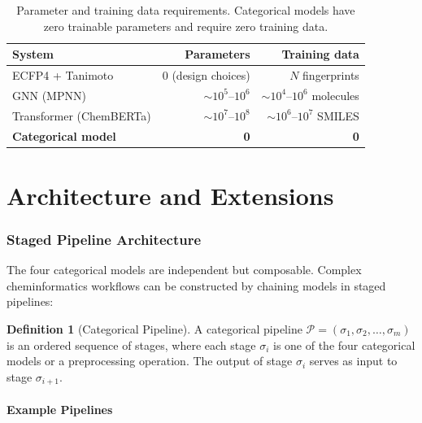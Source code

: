 \documentclass[11pt,twocolumn,a4paper]{article}
\theoremstyle{definition}
\newtheorem{definition}[theorem]{Definition}
\theoremstyle{remark}
\newcommand{\Pipeline}{\mathcal{P}}
\begin{document}
\begin{table}[h]
\centering
\small
\begin{tabular}{lrr}
\toprule
\textbf{System} & \textbf{Parameters} & \textbf{Training data} \\
\midrule
ECFP4 + Tanimoto & 0 (design choices) & $N$ fingerprints \\
GNN (MPNN) & $\sim 10^5$--$10^6$ & $\sim 10^4$--$10^6$ molecules \\
Transformer (ChemBERTa) & $\sim 10^7$--$10^8$ & $\sim 10^6$--$10^7$ SMILES \\
\textbf{Categorical model} & \textbf{0} & \textbf{0} \\
\bottomrule
\end{tabular}
\caption{Parameter and training data requirements. Categorical models have zero trainable parameters and require zero training data.}
\label{tab:parameters}
\end{table}



\part{Architecture and Extensions}

\section{Staged Pipeline Architecture}
\label{sec:staged_architecture}

The four categorical models are independent but composable. Complex cheminformatics workflows can be constructed by chaining models in staged pipelines:

\begin{definition}[Categorical Pipeline]
\label{def:pipeline}
A categorical pipeline $\Pipeline = (\sigma_1, \sigma_2, \ldots, \sigma_m)$ is an ordered sequence of stages, where each stage $\sigma_i$ is one of the four categorical models or a preprocessing operation. The output of stage $\sigma_i$ serves as input to stage $\sigma_{i+1}$.
\end{definition}

\subsection{Example Pipelines}
\end{document}
